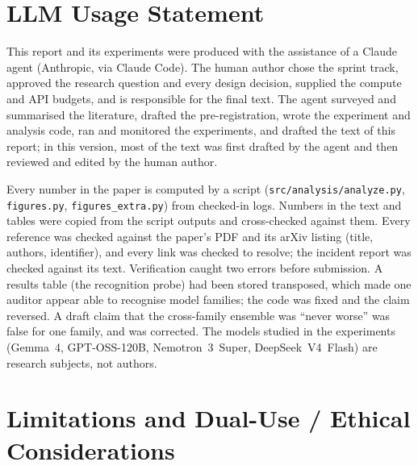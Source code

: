 \documentclass[11pt,letterpaper]{article}
\begin{document}
\section*{LLM Usage Statement}

This report and its experiments were produced with the assistance of a Claude agent (Anthropic, via Claude Code). The human author chose the sprint track, approved the research question and every design decision, supplied the compute and API budgets, and is responsible for the final text. The agent surveyed and summarised the literature, drafted the pre-registration, wrote the experiment and analysis code, ran and monitored the experiments, and drafted the text of this report; in this version, most of the text was first drafted by the agent and then reviewed and edited by the human author.

Every number in the paper is computed by a script (\texttt{src/analysis/analyze.py}, \texttt{figures.py}, \texttt{figures\_extra.py}) from checked-in logs. Numbers in the text and tables were copied from the script outputs and cross-checked against them. Every reference was checked against the paper's PDF and its arXiv listing (title, authors, identifier), and every link was checked to resolve; the incident report was checked against its text. Verification caught two errors before submission. A results table (the recognition probe) had been stored transposed, which made one auditor appear able to recognise model families; the code was fixed and the claim reversed. A draft claim that the cross-family ensemble was ``never worse'' was false for one family, and was corrected. The models studied in the experiments (Gemma~4, GPT-OSS-120B, Nemotron~3~Super, DeepSeek~V4~Flash) are research subjects, not authors.

\appendix
\renewcommand{\thesection}{\Alph{section}}
\titleformat{\section}{\Large}{Appendix \thesection\ ---}{0.45em}{}
\renewcommand{\thetable}{\thesection\arabic{table}}
\renewcommand{\thefigure}{\thesection\arabic{figure}}

\section{Limitations and Dual-Use / Ethical Considerations}
\setcounter{table}{0}\setcounter{figure}{0}
\end{document}
